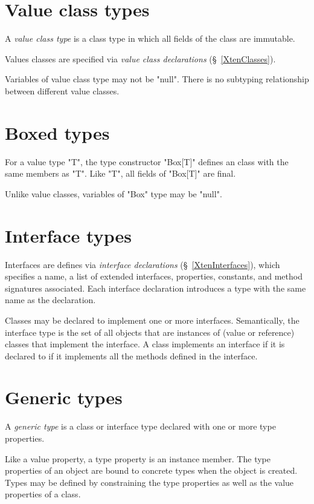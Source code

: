\section{Value class types}

A {\em value class type}
is a class type in which all fields of the class are immutable.

Values classes are specified via {\em value class declarations}
(\S~\ref{XtenClasses}).

Variables of value class type may not be \xcd"null".
There is no subtyping relationship between different value
classes.

\section{Boxed types}

For a value type \xcd"T", the type constructor \xcd"Box[T]"
defines an class with the same members as \xcd"T". 
Like \xcd"T", all fields of \xcd"Box[T]" are final.

Unlike value classes, variables of \xcd"Box" type may be \xcd"null".

\section{Interface types}\label{InterfaceTypes}

Interfaces are defines via {\em interface declarations}
(\S~\ref{XtenInterfaces}),
which specifies a name, a list of extended
interfaces, properties,
constants, and
method signatures associated. Each interface
declaration introduces a type with the same name as the declaration.

Classes may be declared to implement 
one or more interfaces.  
Semantically, the interface type is the set of all objects that are
instances of (value or reference) classes that implement the
interface. A class implements an interface if it is declared to if
it implements all the methods defined in the interface.

\section{Generic types}

A {\em generic type} is a class or interface type declared with
one or more type properties.

Like a value property, a type property is an instance member.
The type properties of an object are bound to concrete types
when the object is
created.
Types may be defined by constraining the type properties as
well as the value properties of a class.

